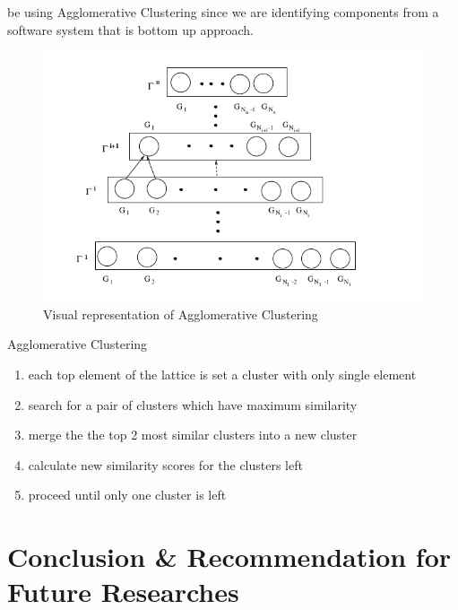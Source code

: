 \documentclass[12pt]{article}
\begin{document}
be using Agglomerative Clustering since we are identifying components from a software system that is bottom up approach.

\begin{figure}
	\includegraphics[scale=0.7]{agglomerativeClustering.png}
	\caption{Visual representation of Agglomerative Clustering\cite{formal}}
	
\end{figure}

\begin{algorithm}
	\caption{Agglomerative Clustering}\label{alg:cap}
	\begin{enumerate}
		\item each top element of the lattice is set a cluster with only single element
		\item search for a pair of clusters which have maximum similarity 
		\item merge the the top 2 most similar clusters into a new cluster
		\item calculate new similarity scores for the clusters left
		\item proceed until only one cluster is left
	\end{enumerate}
\end{algorithm}
\section{Conclusion \& Recommendation for Future Researches}
\end{document}

